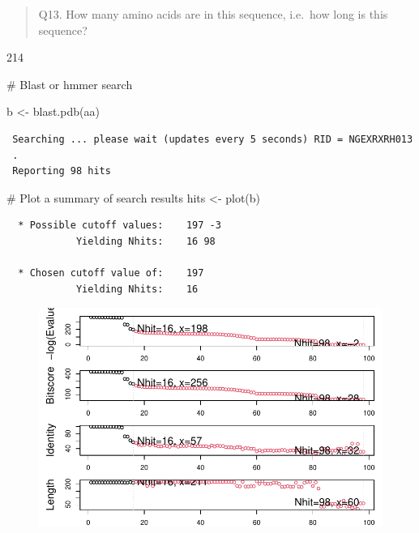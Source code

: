 \documentclass[
  letterpaper,
  DIV=11,
  numbers=noendperiod]{scrartcl}
\newenvironment{Shaded}{\begin{snugshade}}{\end{snugshade}}
\newcommand{\CommentTok}[1]{\textcolor[rgb]{0.37,0.37,0.37}{#1}}
\newcommand{\FunctionTok}[1]{\textcolor[rgb]{0.28,0.35,0.67}{#1}}
\newcommand{\NormalTok}[1]{\textcolor[rgb]{0.00,0.23,0.31}{#1}}
\newcommand{\OtherTok}[1]{\textcolor[rgb]{0.00,0.23,0.31}{#1}}
\begin{document}
\begin{quote}
Q13. How many amino acids are in this sequence, i.e.~how long is this
sequence?
\end{quote}

214

\begin{Shaded}
\begin{Highlighting}[]
\CommentTok{\# Blast or hmmer search }

\NormalTok{b }\OtherTok{\textless{}{-}} \FunctionTok{blast.pdb}\NormalTok{(aa)}
\end{Highlighting}
\end{Shaded}

\begin{verbatim}
 Searching ... please wait (updates every 5 seconds) RID = NGEXRXRH013 
 .
 Reporting 98 hits
\end{verbatim}

\begin{Shaded}
\begin{Highlighting}[]
\CommentTok{\# Plot a summary of search results}
\NormalTok{hits }\OtherTok{\textless{}{-}} \FunctionTok{plot}\NormalTok{(b)}
\end{Highlighting}
\end{Shaded}

\begin{verbatim}
  * Possible cutoff values:    197 -3 
            Yielding Nhits:    16 98 

  * Chosen cutoff value of:    197 
            Yielding Nhits:    16 
\end{verbatim}

\begin{figure}[H]

{\centering \includegraphics{Class09_files/figure-pdf/unnamed-chunk-7-1.pdf}

}

\end{figure}
\end{document}
